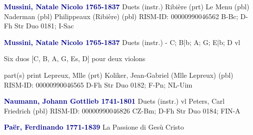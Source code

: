 \documentclass[twocolumn]{book}
\begin{document}
\newline \par \vspace{7pt} \textcolor{darkblue}{\textbf{Mussini, Natale Nicolo  1765-1837}}
\newline Duets (instr.)
\newline Ribière  (prt)
\newline Le Menu  (pbl)
\newline Naderman  (pbl)
\newline Philippeaux (Ribière)  (pbl)
\newline RISM-ID: 00000990046562
\newline B-Bc; D-Fh  Str Duo 0181; I-Sac
\newline \par \vspace{7pt} \textcolor{darkblue}{\textbf{Mussini, Natale Nicolo  1765-1837}}
\newline Duets (instr.) - C; B|b; A; G; E|b; D
 vl
\newline \begin{itshape}Six duos [C, B, A, G, Es, D] pour deux violons\end{itshape} 
\newline \textcolor{darkblue}{}  part(s)
\newline print
\newline Lepreux, Mlle  (prt)
\newline Koliker, Jean-Gabriel (Mlle Lepreux)  (pbl)
\newline RISM-ID: 00000990046565
\newline D-Fh  Str Duo 0182; F-Pn; NL-Uim
\newline \par \vspace{7pt} \textcolor{darkblue}{\textbf{Naumann, Johann Gottlieb  1741-1801}}
\newline Duets (instr.)
 vl
\newline Peters, Carl Friedrich  (pbl)
\newline RISM-ID: 00000990046826
\newline CZ-Bm; D-Fh  Str Duo 0184; FIN-A
\newline \par \vspace{7pt} \textcolor{darkblue}{\textbf{Paër, Ferdinando  1771-1839}}
\newline La Passione di Gesù Cristo
\end{document}
